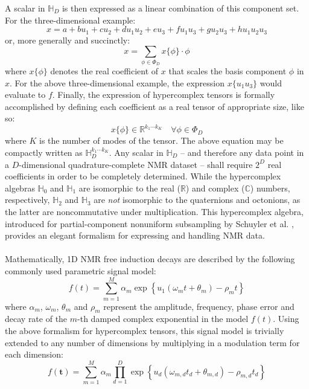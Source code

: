 \begin{doublespace}
A scalar in $\mathbb{H}_D$ is then expressed as a linear combination of this
component set. For the three-dimensional example:
\begin{equation}
x = a + b u_1 + c u_2 + d u_1 u_2
  + e u_3 + f u_1 u_3 + g u_2 u_3 + h u_1 u_2 u_3
\end{equation}
or, more generally and succinctly:
\begin{equation}
x = \sum_{\phi \in \Phi_D} x \{ \phi \} \cdot \phi
\end{equation}
where $x\{\phi\}$ denotes the real coefficient of $x$ that scales the basis
component $\phi$ in $x$. For the above three-dimensional example, the
expression $x\{u_1 u_3\}$ would evaluate to $f$. Finally, the expression of
hypercomplex tensors is formally accomplished by defining each coefficient
as a real tensor of appropriate size, like so:
\begin{equation}
x \{ \phi \} \in \mathbb{R}^{k_1 \cdots k_K} \quad \forall \phi \in \Phi_D
\end{equation}
where $K$ is the number of modes of the tensor. The above equation may be
compactly written as $\mathbb{H}_D^{k_1 \cdots k_K}$. Any scalar
in $\mathbb{H}_D$ -- and therefore any data point in a $D$-dimensional
quadrature-complete NMR dataset -- shall require $2^D$ real coefficients
in order to be completely determined. While the hypercomplex
algebras $\mathbb{H}_0$ and $\mathbb{H}_1$ are isomorphic to the real 
($\mathbb{R}$) and complex ($\mathbb{C}$) numbers, respectively, $\mathbb{H}_2$
and $\mathbb{H}_3$ are {\it not} isomorphic to the quaternions and octonions,
as the latter are noncommutative under multiplication. This hypercomplex
algebra, introduced for partial-component nonuniform subsampling by Schuyler
et al. \cite{schuyler:jmr2013}, provides an elegant formalism for expressing
and handling NMR data.
\\\\
Mathematically, 1D NMR free induction decays are described by the following
commonly used parametric signal model:
\begin{equation}
f(t) = \sum_{m=1}^M \alpha_m \exp\left\{
  u_1 (\omega_m t + \theta_m) - \rho_m t
  \right\}
\end{equation}
where $\alpha_m$, $\omega_m$, $\theta_m$ and $\rho_m$ represent the amplitude,
frequency, phase error and decay rate of the $m$-th damped complex exponential
in the model $f(t)$. Using the above formalism for hypercomplex tensors, this
signal model is trivially extended to any number of dimensions by multiplying
in a modulation term for each dimension:
\begin{equation}
f(\mathbf{t}) = \sum_{m=1}^M \alpha_m \prod_{d=1}^D \exp\left\{
  u_d (\omega_{m,d} t_d + \theta_{m,d}) - \rho_{m,d} t_d
  \right\}
\end{equation}


\end{doublespace}
